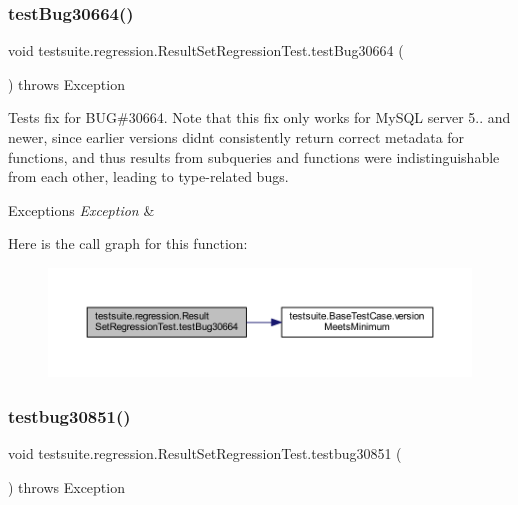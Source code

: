 \subsubsection{\texorpdfstring{test\+Bug30664()}{testBug30664()}}
{\footnotesize\ttfamily void testsuite.\+regression.\+Result\+Set\+Regression\+Test.\+test\+Bug30664 (\begin{DoxyParamCaption}{ }\end{DoxyParamCaption}) throws Exception}

Tests fix for B\+UG\#30664. Note that this fix only works for My\+S\+QL server 5.. and newer, since earlier versions didn\textquotesingle{}t consistently return correct metadata for functions, and thus results from subqueries and functions were indistinguishable from each other, leading to type-\/related bugs.


\begin{DoxyExceptions}{Exceptions}
{\em Exception} & \\
\hline
\end{DoxyExceptions}
Here is the call graph for this function\+:
\nopagebreak
\begin{figure}[H]
\begin{center}
\leavevmode
\includegraphics[width=350pt]{classtestsuite_1_1regression_1_1_result_set_regression_test_a4a7f176d9e3539b3acd902e97e904e17_cgraph}
\end{center}
\end{figure}
\mbox{\label{classtestsuite_1_1regression_1_1_result_set_regression_test_af0003fc9fd4769efb8aac00270eeec6f}} 
\subsubsection{\texorpdfstring{testbug30851()}{testbug30851()}}
{\footnotesize\ttfamily void testsuite.\+regression.\+Result\+Set\+Regression\+Test.\+testbug30851 (\begin{DoxyParamCaption}{ }\end{DoxyParamCaption}) throws Exception}

